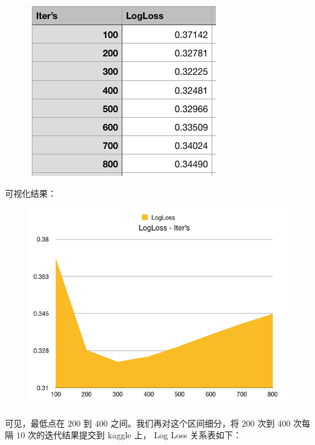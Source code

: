 \documentclass{article}
\begin{document}
\begin{figure}[!h]
\centering
\includegraphics[scale=0.5]{tu11.png}
\end{figure}

\newpage

可视化结果：

\begin{figure}[!h]
\centering
\includegraphics[scale=0.4]{tu12.png}
\end{figure}

可见，最低点在 $200$ 到 $400$ 之间。我们再对这个区间细分，将 $200$ 次到 $400$ 次每隔 $10$ 次的迭代结果提交到 kaggle 上， Log Loss 关系表如下：
\end{document}
